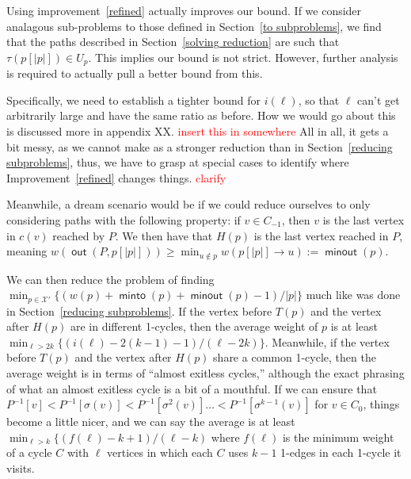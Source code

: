 \documentclass{article}
\theoremstyle{definition}
\DeclareMathOperator{\minto}{\bm{\mathsf{minto}}}
\DeclareMathOperator{\minout}{\bm{\mathsf{minout}}}
\DeclareMathOperator{\out}{\bm{\mathsf{out}}}
\newcommand{\hide}[1]{}
\newcommand{\edit}[1]{\textcolor{red}{#1}}
\begin{document}
Using improvement~\ref{refined} actually improves our bound. If we consider analagous sub-problems to those defined in Section~\ref{to subproblems}, we find that the paths described in Section~\ref{solving reduction} are such that $\tau(p[|p|]) \in U_p$. This implies our bound is not strict. However, further analysis is required to actually pull a better bound from this. 

Specifically, we need to establish a tighter bound for $i(\ell)$, so that $\ell$ can't get arbitrarily large and have the same ratio as before. How we would go about this is discussed more in appendix XX.\edit{ insert this in somewhere} All in all, it gets a bit messy, as we cannot make as a stronger reduction than in Section~\ref{reducing subproblems}, thus, we have to grasp at special cases to identify where Improvement~\ref{refined} changes things.\edit{ clarify}

\hide{
Unfortunately, improvement 2 is still not sufficient to improve the lower bound. Solving analagous subproblems to those established in 5.1, we may reuse the solutions provided in 5.3 to get the same bound. (however, we now have that $\ell_1$ now has only one solution, as the larger values now have an additional weight)}

Meanwhile, a dream scenario would be if we could reduce ourselves to only considering paths with the following property: if $v \in C_{-1}$, then $v$ is the last vertex in $c(v)$ reached by $P$. We then have that $H(p)$ is the last vertex reached in $P$, meaning $w(\out(P,p[|p|])) \geq \min_{u\not \in p} w(p[|p|] \to u) := \minout(p)$.

We can then reduce the problem of finding $\min_{p \in \mathcal{X}'}\{(w(p)+\minto(p)+\minout(p)-1)/|p|\}$ much like was done in Section~\ref{reducing subproblems}. If the vertex before $T(p)$ and the vertex after $H(p)$ are in different 1-cycles, then the average weight of $p$ is at least $\min_{\ell > 2k} \{(i(\ell)-2(k-1)-1)/(\ell-2k)\} $. Meanwhile, if the vertex before $T(p)$ and the vertex after $H(p)$ share a common 1-cycle, then the average weight is in terms of ``almost exitless cycles,'' although the exact phrasing of what an almost exitless cycle is a bit of a mouthful. If we can ensure that $P^{-1}[v]  <P^{-1}[\sigma(v)] < P^{-1}[\sigma^2(v)] \dots < P^{-1}[\sigma^{k-1}(v)]$ for $v \in C_0$, things become a little nicer, and we can say the average is at least $\min_{\ell > k} \{(f(\ell)-k+1)/(\ell-k)$ where $f(\ell)$ is the minimum weight of a cycle $C$ with $\ell$ vertices in which each $C$ uses $k-1$ 1-edges in each 1-cycle it visits. 
\end{document}
